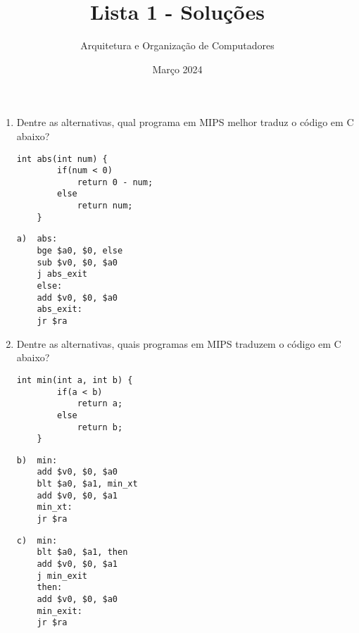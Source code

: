 \documentclass{article}
\title{\Huge Lista 1 - Soluções}
\author{\Large Arquitetura e Organização de Computadores}
\date{Março 2024}
\begin{document}
\maketitle

\begin{enumerate}

\item \large Dentre as alternativas, qual programa em MIPS melhor traduz o código em C abaixo?

\begin{center}
    \begin{minipage}{0.5\textwidth}
        \begin{lstlisting}[frame=single]
    int abs(int num) {
        if(num < 0)
            return 0 - num;
        else
            return num;
    }
        \end{lstlisting}
    \end{minipage}

    \begin{minipage}{0.4\textwidth}
        \begin{lstlisting}[frame=single]
a)  abs:
    bge $a0, $0, else
    sub $v0, $0, $a0
    j abs_exit
    else:
    add $v0, $0, $a0
    abs_exit:
    jr $ra
        \end{lstlisting}%
    \end{minipage}
\end{center}

\pagebreak
\item \large Dentre as alternativas, quais programas em MIPS traduzem o código em C abaixo?

\begin{center}
    \begin{minipage}{0.5\textwidth}
        \begin{lstlisting}[frame=single]
    int min(int a, int b) {
        if(a < b)
            return a;
        else
            return b;
    }
        \end{lstlisting}
    \end{minipage}
\end{center}

\begin{minipage}{0.4\textwidth}
    \begin{lstlisting}[frame=single]
b)  min:
    add $v0, $0, $a0
    blt $a0, $a1, min_xt
    add $v0, $0, $a1
    min_xt:
    jr $ra
    \end{lstlisting}%
\end{minipage}
\hspace{1cm}
\begin{minipage}{0.4\textwidth}
    \begin{lstlisting}[frame=single]
c)  min:
    blt $a0, $a1, then
    add $v0, $0, $a1
    j min_exit
    then:
    add $v0, $0, $a0
    min_exit:
    jr $ra
    \end{lstlisting}%
\end{minipage}


\end{enumerate}
\end{document}
